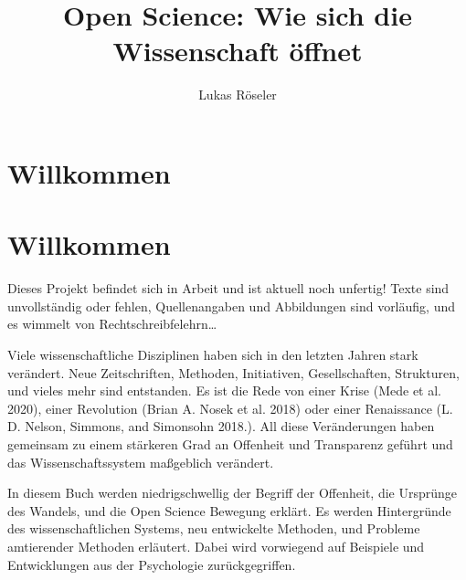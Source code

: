 \documentclass[
  letterpaper,
  DIV=11,
  numbers=noendperiod]{scrreprt}
\title{Open Science: Wie sich die Wissenschaft öffnet}
\author{Lukas Röseler}
\date{}
\renewcommand*\contentsname{Table of contents}
\newcommand\contentsname{Table of contents}
\begin{document}
\maketitle

\renewcommand*\contentsname{Table of contents}
{
\hypersetup{linkcolor=}
\setcounter{tocdepth}{2}
\tableofcontents
}


\chapter{Willkommen}\label{willkommen}


\chapter*{Willkommen}\label{willkommen-1}


\begin{tcolorbox}[enhanced jigsaw, left=2mm, colback=white, colframe=quarto-callout-caution-color-frame, opacitybacktitle=0.6, opacityback=0, title=\textcolor{quarto-callout-caution-color}{\faFire}\hspace{0.5em}{Warnung}, toptitle=1mm, coltitle=black, colbacktitle=quarto-callout-caution-color!10!white, titlerule=0mm, bottomtitle=1mm, leftrule=.75mm, breakable, rightrule=.15mm, bottomrule=.15mm, toprule=.15mm, arc=.35mm]

Dieses Projekt befindet sich in Arbeit und ist aktuell noch unfertig!
Texte sind unvollständig oder fehlen, Quellenangaben und Abbildungen
sind vorläufig, und es wimmelt von Rechtschreibfelehrn\ldots{}

\end{tcolorbox}

Viele wissenschaftliche Disziplinen haben sich in den letzten Jahren
stark verändert. Neue Zeitschriften, Methoden, Initiativen,
Gesellschaften, Strukturen, und vieles mehr sind entstanden. Es ist die
Rede von einer Krise (Mede et al. 2020), einer Revolution (Brian A.
Nosek et al. 2018) oder einer Renaissance (L. D. Nelson, Simmons, and
Simonsohn 2018.). All diese Veränderungen haben gemeinsam zu einem
stärkeren Grad an Offenheit und Transparenz geführt und das
Wissenschaftssystem maßgeblich verändert.

In diesem Buch werden niedrigschwellig der Begriff der Offenheit, die
Ursprünge des Wandels, und die Open Science Bewegung erklärt. Es werden
Hintergründe des wissenschaftlichen Systems, neu entwickelte Methoden,
und Probleme amtierender Methoden erläutert. Dabei wird vorwiegend auf
Beispiele und Entwicklungen aus der Psychologie zurückgegriffen.
\end{document}
